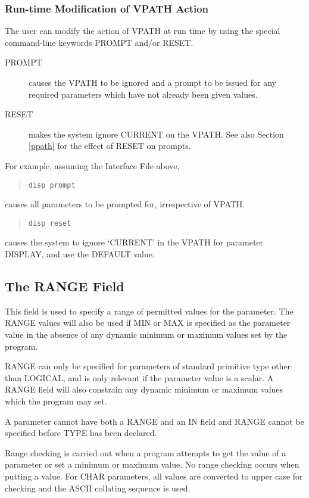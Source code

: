 \documentclass[twoside,11pt]{article}
\newcommand{\xlabel}[1]{}
\renewcommand{\_}{\texttt{\symbol{95}}}
\begin{document}
\subsubsection*{Run-time Modification of VPATH Action}
The user can modify the action of VPATH at run time by using
the special command-line keywords PROMPT and/or RESET.
\begin{description}
\item[PROMPT] causes the VPATH to be ignored and a prompt to be issued
for any required parameters which have not already been given values.
\item[RESET] makes the system ignore CURRENT on the VPATH.
See also Section \ref{ppath} for the effect of RESET on prompts.
\end{description}
For example, assuming the Interface File above,
\begin{quote} \begin{verbatim}
disp prompt
\end{verbatim} \end{quote}
causes all parameters to be prompted for, irrespective of VPATH.
\begin{quote} \begin{verbatim}
disp reset
\end{verbatim} \end{quote}
causes the system to ignore `CURRENT' in the VPATH for parameter DISPLAY,
and use the DEFAULT value.

\subsection{The RANGE Field
\xlabel{the_range_field}\label{range}}

This field is used to specify a range of permitted values for the parameter.
The RANGE values will also be used if MIN or MAX is specified as the parameter
value in the absence of any dynamic minimum or maximum values set by the
program.

RANGE can only be specified for parameters of standard primitive type other
than \_LOGICAL, and is only relevant if the parameter value is a scalar.
A RANGE field will also constrain any dynamic minimum or maximum values which
the program may set.

A parameter cannot have both a RANGE and an IN field and RANGE cannot be
specified before TYPE has been declared.

Range checking is carried out
when a program attempts to get the value of a parameter or set a minimum
or maximum value. No range checking occurs when putting a value.
For \_CHAR parameters, all values are converted to upper case for checking and
the ASCII collating sequence is used.
\end{document}
